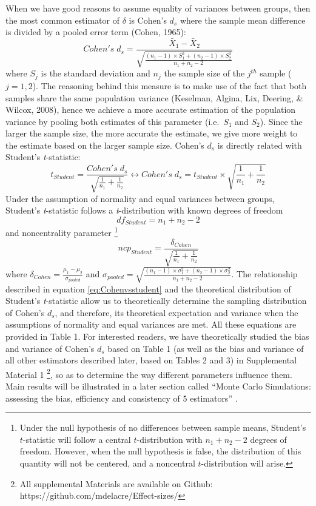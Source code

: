 \documentclass[
  english,
  man,floatsintext]{apa6}
\begin{document}
When we have good reasons to assume equality of variances between groups, then the most common estimator of \(\delta\) is Cohen's \(d_{s}\) where the sample mean difference is divided by a pooled error term (Cohen, 1965):
\begin{equation*} 
Cohen's \; d_s = \frac{\bar{X}_1-\bar{X}_2}{\sqrt{\frac{(n_1-1) \times S_1^2+(n_2-1) \times S_2^2}{n_1+n_2-2}}}
\label{eq:Cohends}
\end{equation*}
where \(S_j\) is the standard deviation and \(n_j\) the sample size of the \(j^{th}\) sample (\(j=1,2\)). The reasoning behind this measure is to make use of the fact that both samples share the same population variance (Keselman, Algina, Lix, Deering, \& Wilcox, 2008), hence we achieve a more accurate estimation of the population variance by pooling both estimates of this parameter (i.e.~\(S_1\) and \(S_2\)). Since the larger the sample size, the more accurate the estimate, we give more weight to the estimate based on the larger sample size. Cohen's \(d_{s}\) is directly related with Student's \emph{t}-statistic:
\begin{equation} 
t_{Student}=\frac{Cohen's \; d_s}{\sqrt{\frac{1}{n_1}+\frac{1}{n_2}}}\leftrightarrow Cohen's \; d_s =  t_{Student} \times \sqrt{\frac{1}{n_1}+\frac{1}{n_2}}
\label{eq:Cohenvsstudent}
\end{equation}
Under the assumption of normality and equal variances between groups, Student's \emph{t}-statistic follows a \emph{t}-distribution with known degrees of freedom
\begin{equation} 
df_{Student} = n_1+n_2-2
\label{eq:studentdf}
\end{equation}
and noncentrality parameter \footnote{Under the null hypothesis of no differences between sample means, Student's $t$-statistic will follow a central $t$-distribution with $n_1+n_2-2$ degrees of freedom. However, when the null hypothesis is false, the distribution of this quantity will not be centered, and a noncentral $t$-distribution will arise.}
\[ncp_{Student} = \frac{\delta_{Cohen}}{\sqrt{\frac{1}{n_1}+\frac{1}{n_2}}}\]
where \(\delta_{Cohen}= \frac{\mu_1-\mu_2}{\sigma_{pooled}}\) and \(\sigma_{pooled}= \sqrt{\frac{(n_1-1) \times \sigma^2_1+(n_2-1) \times \sigma^2_2}{n_1+n_2-2}}\). The relationship described in equation \ref{eq:Cohenvsstudent} and the theoretical distribution of Student's \emph{t}-statistic allow us to theoretically determine the sampling distribution of Cohen's \(d_s\), and therefore, its theoretical expectation and variance when the assumptions of normality and equal variances are met. All these equations are provided in Table 1. For interested readers, we have theoretically studied the bias and variance of Cohen's \(d_s\) based on Table 1 (as well as the bias and variance of all other estimators described later, based on Tables 2 and 3) in Supplemental Material 1 \footnote{All supplemental Materials are available on Github: https://github.com/mdelacre/Effect-sizes/}, so as to determine the way different parameters influence them. Main results will be illustrated in a later section called \enquote{Monte Carlo Simulations: assessing the bias, efficiency and consistency of 5 estimators} .
\end{document}
